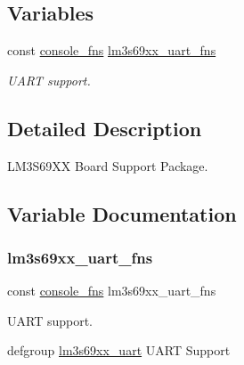 \subsection*{Variables}
\begin{DoxyCompactItemize}
\item 
const \mbox{\hyperlink{struct__console__fns}{console\+\_\+fns}} \mbox{\hyperlink{group__RTEMSBSPsARMLM3S69XX_ga4664207a5cc922db1ab29707f93caf8f}{lm3s69xx\+\_\+uart\+\_\+fns}}
\begin{DoxyCompactList}\small\item\em U\+A\+RT support. \end{DoxyCompactList}\end{DoxyCompactItemize}


\subsection{Detailed Description}
L\+M3\+S69\+XX Board Support Package. 



\subsection{Variable Documentation}
\mbox{\label{group__RTEMSBSPsARMLM3S69XX_ga4664207a5cc922db1ab29707f93caf8f}} 
\subsubsection{\texorpdfstring{lm3s69xx\_uart\_fns}{lm3s69xx\_uart\_fns}}
{\footnotesize\ttfamily const \mbox{\hyperlink{struct__console__fns}{console\+\_\+fns}} lm3s69xx\+\_\+uart\+\_\+fns}



U\+A\+RT support. 

defgroup \mbox{\hyperlink{structlm3s69xx__uart}{lm3s69xx\+\_\+uart}} U\+A\+RT Support 